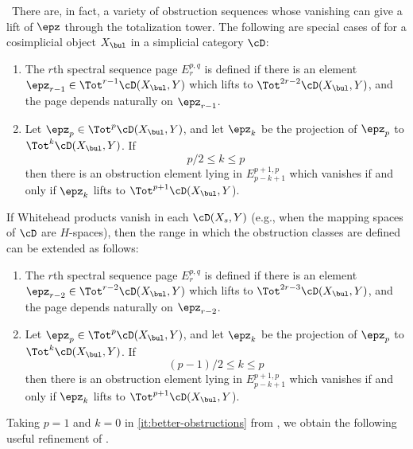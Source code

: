 \documentclass[leqno,oneside,english]{elsarticle}
\begin{document}
\begin{rmk}\label{rem:obstructions} \ 
  There are, in fact, a variety of obstruction sequences whose
  vanishing can give a lift of $\epz$ through the totalization tower.
  The following are special cases of \cite[\S\S~2.4, 2.5, 5.2]{Bou89}
  for a cosimplicial object $X_\bul$ in a simplicial category $\cD$:
  \begin{enumerate}
  \item The $r$th spectral sequence page $E_r^{p,q}$ is defined if
    there is an element $\epz_{r-1} \in \Tot^{r-1} \cD(X_\bul, Y)$
    which lifts to $\Tot^{2r - 2} \cD(X_\bul, Y)$, and the page
    depends naturally on $\epz_{r-1}$.
  \item Let $\epz_p \in \Tot^p \cD(X_\bul, Y)$, and let $\epz_{k}$ be
    the projection of $\epz_p$ to $\Tot^{k} \cD(X_\bul , Y)$. If
    \[
    p/2 \leq k \leq p
    \]  
    then there is an obstruction element lying in $E_{p-k+1}^{p+1, p}$
    which vanishes if and only if $\epz_k$ lifts to $\Tot^{p+1}
    \cD(X_\bul, Y$).
  \end{enumerate}

  If Whitehead products vanish in each $\cD(X_s, Y)$ (e.g., when the mapping spaces of $\cD$ are $H$-spaces), then the
  range in which the obstruction classes are defined can be extended
  as follows:
  \begin{enumerate}
    
  \item The $r$th spectral sequence page $E_r^{p,q}$ is defined if
    there is an element $\epz_{r-2} \in \Tot^{r-2} \cD(X_\bul, Y)$
    which lifts to $\Tot^{2r - 3} \cD(X_\bul, Y)$, and the page
    depends naturally on $\epz_{r-2}$.
  \item \label{it:better-obstructions} Let $\epz_p \in \Tot^p
  \cD(X_\bul, Y)$, and let $\epz_{k}$ be the projection of $\epz_p$ to
  $\Tot^{k} \cD(X_\bul , Y)$. If \[(p-1)/2 \leq k \leq p\]  then there
  is an obstruction element lying in $E_{p-k+1}^{p+1, p}$ which vanishes
  if and only if $\epz_k$ lifts to $\Tot^{p+1} \cD(X_\bul, Y$).
  \end{enumerate}
\end{rmk}

Taking $p=1$ and $k=0$ in \eqref{it:better-obstructions} from
, we obtain the following useful refinement of
\refthmA. 
\end{document}
